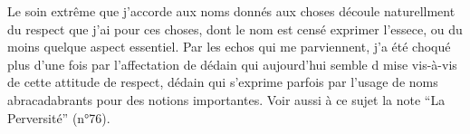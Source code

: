 Le soin extrême que j'accorde aux noms donnés aux choses découle naturellment du respect que j'ai pour ces choses, dont le nom est censé exprimer l'essece, ou du moins quelque aspect essentiel. Par les echos qui me parviennent, j'a été choqué plus d'une fois par l'affectation de dédain qui aujourd'hui semble d mise vis-à-vis de cette attitude de respect, dédain qui s'exprime parfois par l'usage de noms abracadabrants pour des notions importantes. Voir aussi à ce sujet la note ``La Perversité'' (n°76).
